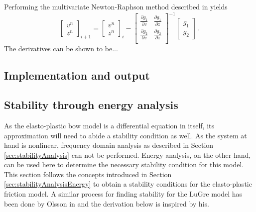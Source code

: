 Performing the multivariate Newton-Raphson method described in yields
\begin{equation}\label{eq:NRit}
    \begin{bmatrix}
    v^n\\
    z^n
    \end{bmatrix}_{i+1}
    =
    \begin{bmatrix}
    v^n\\
    z^n
    \end{bmatrix}_i
    -
    \begin{bmatrix}
    \frac{\partial g_1}{\partial v} & \frac{\partial g_1}{\partial z}\\
    \frac{\partial g_2}{\partial v} & \frac{\partial g_2}{\partial z}\\
    \end{bmatrix}^{-1}
    \begin{bmatrix}
    g_1\\
    g_2
    \end{bmatrix}\,
    .
\end{equation}
The derivatives can be shown to be... 

\subsection{Implementation and output}


\subsection{Stability through energy analysis}
As the elasto-plastic bow model is a differential equation in itself, its approximation will need to abide a stability condition as well.
As the system at hand is nonlinear, frequency domain analysis as described in Section \ref{sec:stabilityAnalysis} can not be performed. Energy analysis, on the other hand, can be used here to determine the necessary stability condition for this model. This section follows the concepts introduced in Section \ref{sec:stabilityAnalysisEnergy} to obtain a stability conditions for the elasto-plastic friction model. A similar process for finding stability for the LuGre model has been done by Olsson in \cite[p. 55]{Olsson1996} and the derivation below is inspired by his. 

